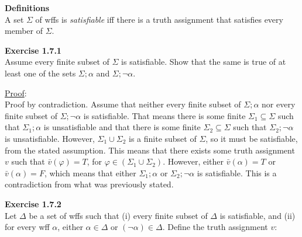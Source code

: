 \documentclass[12pt]{article}	%
\begin{document}

\begin{flushleft}

\textbf{Definitions}\\
A set $\Sigma$ of wffs is \textit{satisfiable} iff there is a truth assignment that satisfies every member of $\Sigma$.\\

\vspace{10mm}

\textbf{Exercise 1.7.1} \\
Assume every finite subset of $\Sigma$ is satisfiable. Show that the same is true of at least one of the sets $\Sigma;\alpha$ and $\Sigma;\neg\alpha$. \\

\vspace{5mm}

\underline{Proof}: \\
Proof by contradiction. Assume that neither every finite subset of $\Sigma;\alpha$ nor every finite subset of $\Sigma;\neg\alpha$ is satisfiable. That means there is some finite $\Sigma_1 \subseteq \Sigma$ such that $\Sigma_1;\alpha$ is unsatisfiable and that there is some finite $\Sigma_2 \subseteq \Sigma$ such that $\Sigma_2;\neg\alpha$ is unsatisfiable. However, $\Sigma_1 \cup \Sigma_2$ is a finite subset of $\Sigma$, so it must be satisfiable, from the stated assumption. This means that there exists some truth assignment $v$ such that $\bar{v}(\varphi) = T$, for $\varphi \in (\Sigma_1 \cup \Sigma_2)$. However, either $\bar{v}(\alpha) = T$ or $\bar{v}(\alpha) = F$, which means that either $\Sigma_1;\alpha$ or $\Sigma_2;\neg\alpha$ is satisfiable. This is a contradiction from what was previously stated. \\

\vspace{10mm}

\textbf{Exercise 1.7.2} \\
Let $\Delta$ be a set of wffs such that (i) every finite subset of $\Delta$ is satisfiable, and (ii) for every wff $\alpha$, either $\alpha \in \Delta$ or $(\neg\alpha) \in \Delta$. Define the truth assignment $v$:


\end{flushleft}
\end{document}
